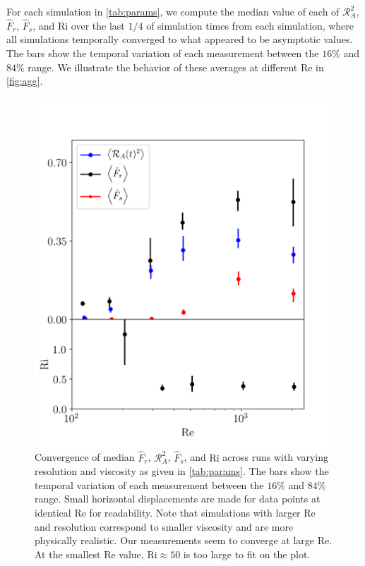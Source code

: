 \documentclass[
        fleqn,
        usenatbib,
        referee,
    ]{mnras}
\begin{document}
For each simulation in \autoref{tab:params}, we compute the median value of each
of $\mathcal{R}_A^2$, $\hat{F}_r$, $\hat{F}_s$, and $\mathrm{Ri}$ over the last
$1/4$ of simulation times from each simulation, where all simulations temporally
converged to what appeared to be asymptotic values. The bars show the temporal
variation of each measurement between the $16\%$ and $84\%$ range. We illustrate
the behavior of these averages at different $\mathrm{Re}$ in \autoref{fig:agg}.
\begin{figure}
    \centering
    \includegraphics[width=\columnwidth]{plots/agg.png}
    \caption{Convergence of median $\hat{F}_r$, $\mathcal{R}_A^2$, $\hat{F}_s$,
    and $\mathrm{Ri}$ across runs with varying resolution and viscosity as given
    in \autoref{tab:params}. The bars show the temporal variation of each
    measurement between the $16\%$ and $84\%$ range. Small horizontal
    displacements are made for data points at identical $\mathrm{Re}$ for
    readability. Note that simulations with larger $\mathrm{Re}$ and resolution
    correspond to smaller viscosity and are more physically realistic. Our
    measurements seem to converge at large $\mathrm{Re}$. At the smallest
    $\mathrm{Re}$ value, $\mathrm{Ri} \approx 50$ is too large to fit on the
    plot.}\label{fig:agg}
\end{figure}
\end{document}
